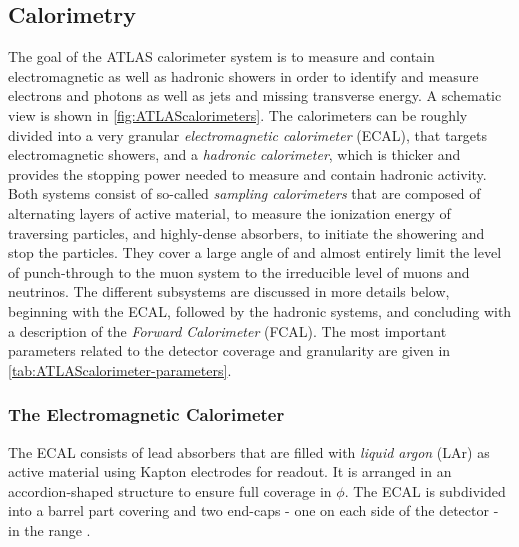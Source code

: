 \subsection{Calorimetry}
The goal of the ATLAS calorimeter system is to measure and contain electromagnetic as well as hadronic showers in order to identify and measure electrons and photons as well as jets and missing transverse energy. A schematic view is shown in \cref{fig:ATLAScalorimeters}.
The calorimeters can be roughly divided into a very granular \emph{electromagnetic calorimeter} (ECAL), that targets electromagnetic showers, and a \emph{hadronic calorimeter}, which is thicker and provides the stopping power needed to measure and contain hadronic activity. Both systems consist of so-called \emph{sampling calorimeters} that are composed of alternating layers of active material, to measure the ionization energy of traversing particles, and highly-dense absorbers, to initiate the showering and stop the particles. 
They cover a large angle of  and almost entirely limit the level of punch-through to the muon system to the irreducible level of muons and neutrinos. The different subsystems are discussed in more details below, beginning with the ECAL, followed by the hadronic systems, and concluding with a description of the \emph{Forward Calorimeter} (FCAL). The most important parameters related to the detector coverage and granularity are given in \cref{tab:ATLAScalorimeter-parameters}.


\subsubsection{The Electromagnetic Calorimeter}
The ECAL consists of lead absorbers that are filled with \emph{liquid argon} (LAr) as active material using Kapton electrodes for readout.
It is arranged in an accordion-shaped structure to ensure full coverage in $\phi$.
The ECAL is subdivided into a barrel part covering  and two end-caps - one on each side of the detector - in the range .


